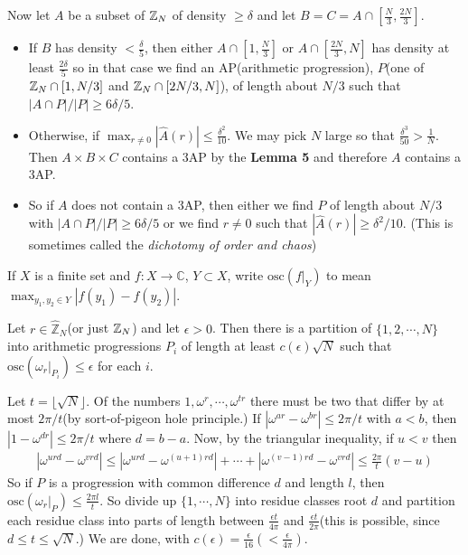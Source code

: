\documentclass[10pt,a4paper]{report}
\renewcommand{\hat}{\widehat}
\newenvironment{proof}
{\begin{changemargin}{1cm}{0.5cm}
	}%
	{\end{changemargin}
}
\begin{document}
Now let $A$ be a subset of $\mathbb{Z}_N$ of density $\geq \delta$ and let $B=C = A\cap [\frac{N}{3},\frac{2N}{3}]$. 

\begin{itemize}
\item  If $B$ has density $< \frac{\delta}{5}$, then either $A \cap [1,\frac{N}{3}]$ or $A\cap [\frac{2N}{3},N]$ has density at least $\frac{2\delta}{5}$ so in that case we find an AP(arithmetic progression), $P$(one of $\mathbb{Z}_N \cap [1,N/3]$ and $\mathbb{Z}_N \cap [2N/3,N]$), of length about $N/3$ such that $|A\cap P| /|P| \geq 6\delta /5$.

\item Otherwise, if $\max_{r\neq 0} |\hat{A}(r)| \leq \frac{\delta^2}{10}$. We may pick $N$ large so that $\frac{\delta^3}{50} > \frac{1}{N}$. Then $A \times B \times C$ contains a 3AP by the \textbf{Lemma 5} and therefore $A$ contains a 3AP.

\item So if $A$ does not contain a 3AP, then either we find $P$ of length about $N/3$ with $|A \cap P|/|P| \geq 6\delta/5$ or we find $r\neq 0$ such that $|\hat{A}(r)| \geq \delta^2/10$. (This is sometimes called the \emph{dichotomy of order and chaos})
\end{itemize}

\s

 If $X$ is a finite set and $f: X \rightarrow \mathbb{C}$, $Y\subset X$, write $\text{osc}(f\big|_{Y})$ to mean $\max_{y_1,y_2 \in Y} |f(y_1) - f(y_2) |$.
\s

 Let $r \in \hat{\mathbb{Z}}_N$(or just $\mathbb{Z}_N$) and let $\epsilon>0$. Then there is a partition of $\{ 1,2,\cdots, N\}$ into arithmetic progressions $P_i$ of length at least $c(\epsilon)\sqrt{N}$ such that $\text{osc}(\omega_r \big|_{P_i}) \leq \epsilon$ for each $i$.

\begin{proof}
\pf Let $t= \lfloor \sqrt{N} \rfloor$. Of the numbers $1,\omega^r,\cdots,\omega^{tr}$ there must be two that differ by at most $2\pi/t$(by sort-of-pigeon hole principle.) If $|\omega^{ar} - \omega^{br} | \leq 2\pi /t$ with $a<b$, then $|1-\omega^{dr}| \leq 2\pi /t$ where $d= b-a$. Now, by the triangular inequality, if $u<v$ then
\begin{align*}
|\omega^{urd} - \omega^{vrd} | \leq |\omega^{urd} - \omega^{(u+1)rd} | + \cdots + |\omega^{(v-1)rd} - \omega^{vrd} | \leq \frac{2\pi}{t} (v-u)
\end{align*}
So if $P$ is a progression with common difference $d$ and length $l$, then $\text{osc} (\omega_{r} \big|_{P}) \leq \frac{2\pi l}{t}$. So divide up $\{1,\cdots, N\}$ into residue classes root $d$ and partition each residue class into parts of length between $\frac{\epsilon t}{4\pi}$ and $\frac{\epsilon t}{2\pi}$(this is possible, since $d\leq t \leq \sqrt{N}$.) We are done, with $c(\epsilon) = \frac{\epsilon}{16}(<\frac{\epsilon}{4\pi})$.

\eop
\end{proof}
\s
\end{document}
